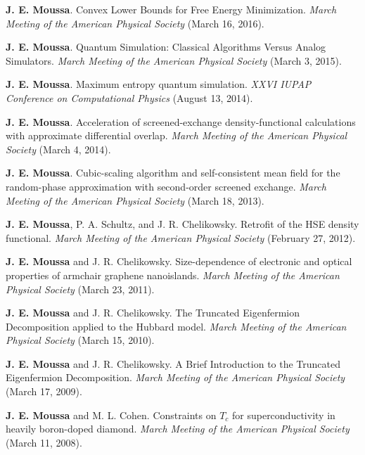 \documentclass[10pt]{article}
\makeatletter
\newlength{\bibhang}
\newlength{\bibsep}
 {\@listi \global\bibsep\itemsep \global\advance\bibsep by\parsep}
\newenvironment{bibsection}%
        {\vspace{-1.6\baselineskip}\begin{etaremune}[leftmargin=1.6em]{%
       \setlength{\leftmargin}{\bibhang}%
       \setlength{\itemindent}{-\leftmargin}%
       \setlength{\itemsep}{\bibsep}%
       \setlength{\parsep}{\z@}%
        \setlength{\partopsep}{0pt}%
        \setlength{\topsep}{0pt}}}
        {\end{etaremune}\vspace{-.6\baselineskip}}
\makeatother
\begin{document}
\begin{bibsection}
 \item \textbf{J. E. Moussa}. Convex Lower Bounds for Free Energy Minimization. \emph{March Meeting of the American Physical Society}
  (March 16, 2016).

 \item \textbf{J. E. Moussa}. Quantum Simulation: Classical Algorithms Versus Analog Simulators. \emph{March Meeting of the American Physical Society}
  (March 3, 2015).

 \item \textbf{J. E. Moussa}. Maximum entropy quantum simulation. \emph{XXVI IUPAP Conference on Computational Physics}
  (August 13, 2014).

 \item \textbf{J. E. Moussa}. Acceleration of screened-exchange density-functional calculations with approximate differential overlap. \emph{March Meeting of the American Physical Society}
  (March 4, 2014).

 \item \textbf{J. E. Moussa}. Cubic-scaling algorithm and self-consistent mean field for the random-phase approximation with second-order screened exchange. \emph{March Meeting of the American Physical Society}
  (March 18, 2013).

 \item \textbf{J. E. Moussa}, P. A. Schultz, and J. R. Chelikowsky. Retrofit of the HSE density functional. \emph{March Meeting of the American Physical Society} (February 27, 2012).

 \item \textbf{J. E. Moussa} and J. R. Chelikowsky. Size-dependence of electronic and optical properties of armchair graphene nanoislands. \emph{March Meeting of the American Physical Society} (March 23, 2011).

 \item \textbf{J. E. Moussa} and J. R. Chelikowsky. The Truncated Eigenfermion Decomposition applied to the Hubbard model. \emph{March Meeting of the American Physical Society} (March 15, 2010).

 \item \textbf{J. E. Moussa} and J. R. Chelikowsky. A Brief Introduction to the Truncated Eigenfermion Decomposition. \emph{March Meeting of the American Physical Society} (March 17, 2009).

 \item \textbf{J. E. Moussa} and M. L. Cohen. Constraints on $T_c$ for superconductivity in heavily boron-doped diamond. \emph{March Meeting of the American Physical Society} (March 11, 2008).


\end{bibsection}
\end{document}
